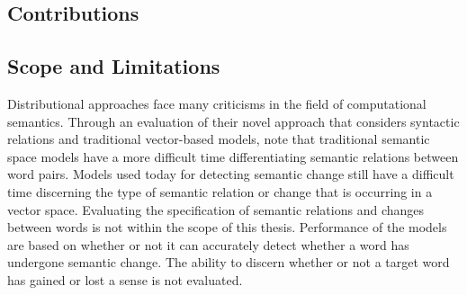 \subsection{Contributions}

\subsection{Scope and Limitations}
\label{intro-scope}
Distributional approaches face many criticisms in the field of computational semantics. Through an evaluation of their novel approach that considers syntactic relations and traditional vector-based models, \citet{pado-lapata-2003-constructing} note that traditional semantic space models have a more difficult time differentiating semantic relations between word pairs. Models used today for detecting semantic change still have a difficult time discerning the type of semantic relation or change that is occurring in a vector space. Evaluating the specification of semantic relations and changes between words is not within the scope of this thesis. Performance of the models are based on whether or not it can accurately detect whether a word has undergone semantic change. The ability to discern whether or not a target word has gained or lost a sense is not evaluated. 

